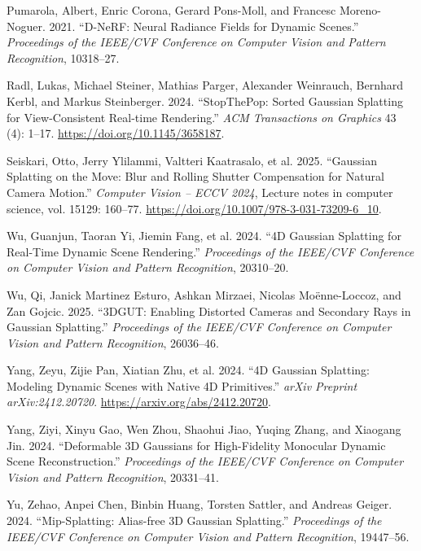 \documentclass[
]{article}
\newlength{\cslhangindent}
\newenvironment{CSLReferences}[2] %
 {\begin{list}{}{%
  \setlength{\itemindent}{0pt}
  \setlength{\leftmargin}{0pt}
  \setlength{\parsep}{0pt}
  \ifodd #1
   \setlength{\leftmargin}{\cslhangindent}
   \setlength{\itemindent}{-1\cslhangindent}
  \fi
  \setlength{\itemsep}{#2\baselineskip}}}
 {\end{list}}
\begin{document}
\begin{CSLReferences}{1}{1}
Pumarola, Albert, Enric Corona, Gerard Pons-Moll, and Francesc
Moreno-Noguer. 2021. {``{D-NeRF: Neural Radiance Fields for Dynamic
Scenes}.''} \emph{Proceedings of the IEEE/CVF Conference on Computer
Vision and Pattern Recognition}, 10318--27.

Radl, Lukas, Michael Steiner, Mathias Parger, Alexander Weinrauch,
Bernhard Kerbl, and Markus Steinberger. 2024. {``{StopThePop: Sorted
Gaussian Splatting for View-Consistent Real-time Rendering}.''}
\emph{ACM Transactions on Graphics} 43 (4): 1--17.
\url{https://doi.org/10.1145/3658187}.

Seiskari, Otto, Jerry Ylilammi, Valtteri Kaatrasalo, et al. 2025.
{``{Gaussian Splatting on the Move: Blur and Rolling Shutter
Compensation for Natural Camera Motion}.''} \emph{Computer Vision --
ECCV 2024}, Lecture notes in computer science, vol. 15129: 160--77.
\url{https://doi.org/10.1007/978-3-031-73209-6_10}.

Wu, Guanjun, Taoran Yi, Jiemin Fang, et al. 2024. {``{4D Gaussian
Splatting for Real-Time Dynamic Scene Rendering}.''} \emph{Proceedings
of the IEEE/CVF Conference on Computer Vision and Pattern Recognition},
20310--20.

Wu, Qi, Janick Martinez Esturo, Ashkan Mirzaei, Nicolas Moënne-Loccoz,
and Zan Gojcic. 2025. {``{3DGUT: Enabling Distorted Cameras and
Secondary Rays in Gaussian Splatting}.''} \emph{Proceedings of the
IEEE/CVF Conference on Computer Vision and Pattern Recognition},
26036--46.

Yang, Zeyu, Zijie Pan, Xiatian Zhu, et al. 2024. {``{4D Gaussian
Splatting: Modeling Dynamic Scenes with Native 4D Primitives}.''}
\emph{arXiv Preprint arXiv:2412.20720}.
\url{https://arxiv.org/abs/2412.20720}.

Yang, Ziyi, Xinyu Gao, Wen Zhou, Shaohui Jiao, Yuqing Zhang, and
Xiaogang Jin. 2024. {``{Deformable 3D Gaussians for High-Fidelity
Monocular Dynamic Scene Reconstruction}.''} \emph{Proceedings of the
IEEE/CVF Conference on Computer Vision and Pattern Recognition},
20331--41.

Yu, Zehao, Anpei Chen, Binbin Huang, Torsten Sattler, and Andreas
Geiger. 2024. {``{Mip-Splatting: Alias-free 3D Gaussian Splatting}.''}
\emph{Proceedings of the IEEE/CVF Conference on Computer Vision and
Pattern Recognition}, 19447--56.


\end{CSLReferences}
\end{document}
